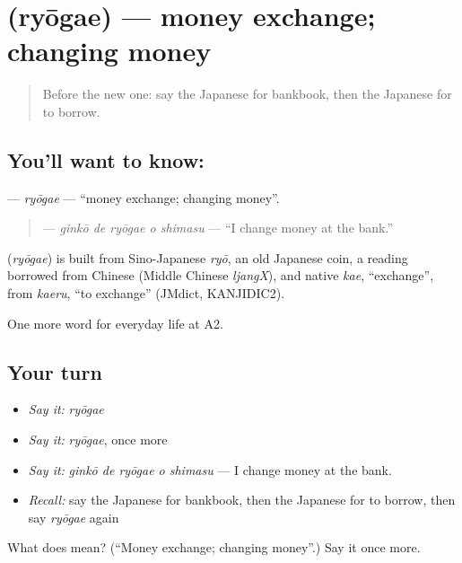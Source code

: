 \section[\texorpdfstring{\ja{りょうがえ} (ryōgae)}{りょうがえ (ryōgae)}]{ (ryōgae) — money exchange; changing money}

\label{lesson:JA-C187-ryougae}



\begin{quote}
Before the new one: say the Japanese for bankbook, then the Japanese for to borrow.
\end{quote}

\subsection*{You'll want to know: }
\textbf{} — \emph{ryōgae} — \textquotedblleft{}money exchange; changing money\textquotedblright{}.

\begin{quote}
\textbf{  } — \emph{ginkō de ryōgae o shimasu} — \textquotedblleft{}I change money at the bank.\textquotedblright{}
\end{quote}

\begin{cousinweb}
\textbf{} (\emph{ryōgae}) is built from Sino-Japanese \emph{ryō}, an old Japanese coin, a reading borrowed from Chinese (Middle Chinese \emph{ljangX}), and native \emph{kae}, \textquotedblleft{}exchange\textquotedblright{}, from \emph{kaeru}, \textquotedblleft{}to exchange\textquotedblright{} (JMdict, KANJIDIC2).
\end{cousinweb}

\begin{grammarlens}[title={What you've built}]
One more word for everyday life at A2.
\end{grammarlens}

\subsection*{Your turn}
\begin{itemize}
\raggedright
  \item \emph{Say it:} \emph{ryōgae}
  \item \emph{Say it:} \emph{ryōgae}, once more
  \item \emph{Say it:} \emph{ginkō de ryōgae o shimasu} — I change money at the bank.
  \item \emph{Recall:} say the Japanese for bankbook, then the Japanese for to borrow, then say \emph{ryōgae} again
\end{itemize}

\begin{tcolorbox}[breakable,colback=teal!4,colframe=teal!35!black,title={Before you move on}]
What does  mean? (\textquotedblleft{}Money exchange; changing money\textquotedblright{}.) Say it once more.
\end{tcolorbox}
